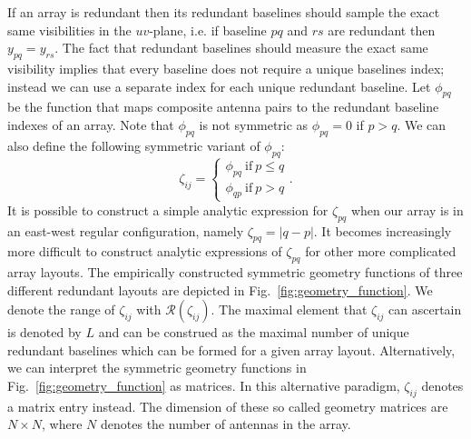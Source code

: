 \documentclass[useAMS,usenatbib]{mn2e}
\begin{document}
If an array is redundant then its redundant baselines should sample the exact same visibilities in the $uv$-plane, i.e. if baseline $pq$ and $rs$ are redundant then $y_{pq} = y_{rs}$. The 
fact that redundant baselines should measure the exact same visibility implies that every baseline does not require a unique baselines index; instead we can use a separate index for each unique redundant baseline. Let $\phi_{pq}$ be the function that maps composite antenna pairs to the redundant baseline indexes of an array. Note that $\phi_{pq}$ is not symmetric as 
$\phi_{pq} = 0$ if $p>q$. We can also define the following symmetric variant of $\phi_{pq}$:
\begin{equation}
\zeta_{ij} = 
\begin{cases}
\phi_{pq}~\textrm{if}~p \leq q\\
\phi_{qp}~\textrm{if}~p>q
\end{cases}.
\end{equation} 
It is possible to construct a simple analytic expression for $\zeta_{pq}$ when our array is in an east-west regular configuration, namely $\zeta_{pq} = |q-p|$. 
It becomes increasingly more difficult to construct analytic expressions of $\zeta_{pq}$ for other more complicated array layouts. The empirically constructed symmetric geometry
functions of three different redundant layouts are depicted in Fig.~\ref{fig:geometry_function}. We denote the range of $\zeta_{ij}$ with $\mathcal{R}(\zeta_{ij})$. The maximal element 
that $\zeta_{ij}$ can ascertain is denoted by $L$ and can be construed as the maximal number of unique redundant baselines which can be formed for a given 
array layout. Alternatively, we can interpret the symmetric geometry functions 
in Fig.~\ref{fig:geometry_function} as matrices. In this alternative paradigm, $\zeta_{ij}$ denotes a matrix entry instead. The dimension of these so called geometry 
matrices are $N\times N$, where $N$ denotes the number of antennas in the array. 
\end{document}
